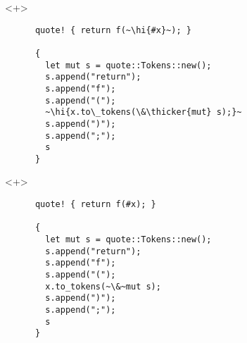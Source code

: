 \documentclass[usepdftitle=false]{beamer}
\renewcommand{\&}{\makebox[\widthof{\ampersand}][c]{\scalebox{0.9}[1.0]{\Book\ampersand}}}
\newcommand{\+}{\makebox[\widthof{+}][c]{\raisebox{-.2\height}{\scalefont{1.5}\Light+}}}
\newcommand{\thicker}[1]{\contourlength{0.26pt}\contour[10]{black}{#1}}
\newcommand{\hi}[1]{%
\tikz[baseline=(A.base)]
 \node[highlighting=0,inner sep=0pt,text depth=0pt] (A) {#1};%
}
\begin{document}
\begin{frame}[fragile]
  \begin{onlyenv}<+>
    \begin{verbatim}
      quote! { return f(~\hi{#x}~); }

      {
        let mut s = quote::Tokens::new();
        s.append("return");
        s.append("f");
        s.append("(");
        ~\hi{x.to\_tokens(\&\thicker{mut} s);}~
        s.append(")");
        s.append(";");
        s
      }
    \end{verbatim}
  \end{onlyenv}
  \begin{onlyenv}<+>
    \begin{verbatim}
      quote! { return f(#x); }

      {
        let mut s = quote::Tokens::new();
        s.append("return");
        s.append("f");
        s.append("(");
        x.to_tokens(~\&~mut s);
        s.append(")");
        s.append(";");
        s
      }
    \end{verbatim}
  \end{onlyenv}
\end{frame}
\end{document}
